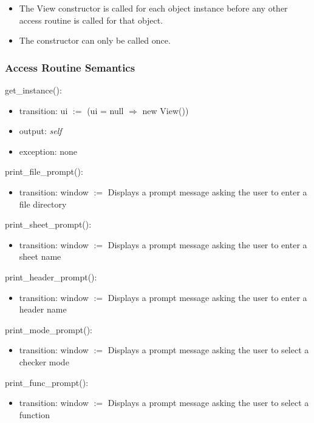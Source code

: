 \documentclass[12pt]{article}
\begin{document}
\begin{itemize}
  \item The View constructor is called for each object instance before any 
  other access routine is called for that object.  
  \item The constructor can only be called once.
\end{itemize}


\subsubsection* {Access Routine Semantics}

\noindent get\_instance():
\begin{itemize}
\item transition: ui $:=$ (ui = null $\Rightarrow$ new View())
\item output: \textit{self}
\item exception: none
\end{itemize}

\noindent print\_file\_prompt():
\begin{itemize}
\item transition: window $:=$ Displays a prompt message asking the user to enter a file directory
\end{itemize}

\noindent print\_sheet\_prompt():
\begin{itemize}
\item transition: window $:=$ Displays a prompt message asking the user to enter a sheet name
\end{itemize}

\noindent print\_header\_prompt():
\begin{itemize}
\item transition: window $:=$ Displays a prompt message asking the user to enter a header name
\end{itemize}

\noindent print\_mode\_prompt():
\begin{itemize}
\item transition: window $:=$ Displays a prompt message asking the user to select a checker mode
\end{itemize}

\noindent print\_func\_prompt():
\begin{itemize}
\item transition: window $:=$ Displays a prompt message asking the user to select a function
\end{itemize}
\end{document}
